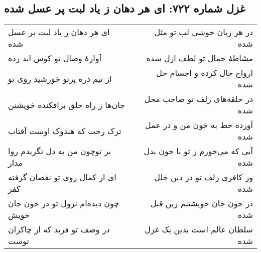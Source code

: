\begin{center}
\section*{غزل شماره ۷۲۲: ای هر دهان ز یاد لبت پر عسل شده}
\label{sec:722}
\begin{longtable}{l p{0.5cm} r}
ای هر دهان ز یاد لبت پر عسل شده
&&
در هر زبان خوشی لب تو مثل شده
\\
آوازهٔ وصال تو کوس ابد زده
&&
مشاطهٔ جمال تو لطف ازل شده
\\
از نیم ذره پرتو خورشید روی تو
&&
ارواح حال کرده و اجسام حل شده
\\
جان‌ها ز راه حلق برافکنده خویشتن
&&
در حلقه‌های زلف تو صاحب محل شده
\\
ترک رخت که هندوک اوست آفتاب
&&
آورده خط به خون من و در عمل شده
\\
بر توچون من به دل نگریدم روا مدار
&&
آبی که می‌خورم ز تو با خون بدل شده
\\
ای از کمال روی تو نقصان گرفته کفر
&&
وز کافری زلف تو در دین خلل شده
\\
چون دیده‌ام نزول تو در خون جان خویش
&&
در خون جان خویشتنم زین قبل شده
\\
در وصف تو فرید که از چاکران توست
&&
سلطان عالم است بدین یک غزل شده
\\
\end{longtable}
\end{center}

